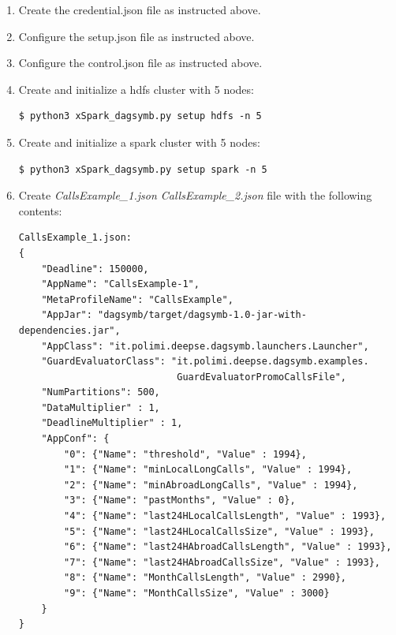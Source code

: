 \begin{enumerate}
\def\labelenumi{\arabic{enumi})}
\item
Create the credential.json file as instructed above.
\item
Configure the setup.json file as instructed above.
\item
Configure the control.json file as instructed above.
\item
Create and initialize a hdfs cluster with 5 nodes:

\begin{verbatim}
$ python3 xSpark_dagsymb.py setup hdfs -n 5
\end{verbatim}
\item
Create and initialize a spark cluster with 5 nodes:
\begin{verbatim}
$ python3 xSpark_dagsymb.py setup spark -n 5
\end{verbatim}
\item
Create \emph{CallsExample\_1.json CallsExample\_2.json} file with the following contents:
\begin{verbatim}
CallsExample_1.json:
{
    "Deadline": 150000,
    "AppName": "CallsExample-1",
    "MetaProfileName": "CallsExample",
    "AppJar": "dagsymb/target/dagsymb-1.0-jar-with-dependencies.jar",
    "AppClass": "it.polimi.deepse.dagsymb.launchers.Launcher",
    "GuardEvaluatorClass": "it.polimi.deepse.dagsymb.examples.
                            GuardEvaluatorPromoCallsFile",
    "NumPartitions": 500,
    "DataMultiplier" : 1,
    "DeadlineMultiplier" : 1,
    "AppConf": {
        "0": {"Name": "threshold", "Value" : 1994},
        "1": {"Name": "minLocalLongCalls", "Value" : 1994},
        "2": {"Name": "minAbroadLongCalls", "Value" : 1994},
        "3": {"Name": "pastMonths", "Value" : 0},
        "4": {"Name": "last24HLocalCallsLength", "Value" : 1993},
        "5": {"Name": "last24HLocalCallsSize", "Value" : 1993},
        "6": {"Name": "last24HAbroadCallsLength", "Value" : 1993},
        "7": {"Name": "last24HAbroadCallsSize", "Value" : 1993},
        "8": {"Name": "MonthCallsLength", "Value" : 2990},
        "9": {"Name": "MonthCallsSize", "Value" : 3000}
    }
}


\end{verbatim}
\end{enumerate}
